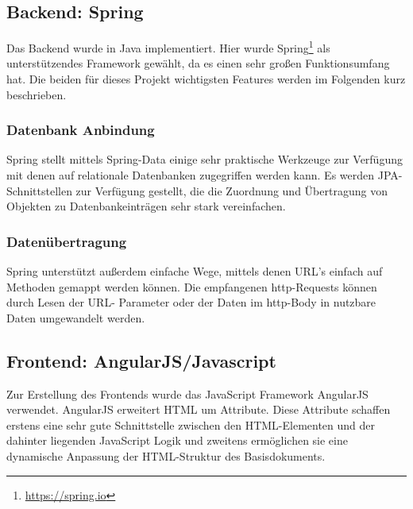 \subsection{Backend: Spring}
Das Backend wurde in Java implementiert. Hier wurde Spring\footnote{\url{https://spring.io}} als unterstützendes Framework gewählt, da es einen sehr großen Funktionsumfang hat. Die beiden für dieses Projekt wichtigsten Features werden im Folgenden kurz beschrieben.

\subsubsection{Datenbank Anbindung}
Spring stellt mittels Spring-Data einige sehr praktische Werkzeuge zur Verfügung mit denen auf relationale Datenbanken zugegriffen werden kann. Es werden JPA-Schnittstellen zur Verfügung gestellt, die die Zuordnung und Übertragung von Objekten zu Datenbankeinträgen sehr stark vereinfachen.

\subsubsection{Datenübertragung}
Spring unterstützt außerdem einfache Wege, mittels denen URL's einfach auf Methoden gemappt werden können. Die empfangenen http-Requests können durch Lesen der URL- Parameter oder der Daten im http-Body in nutzbare Daten umgewandelt werden.

\subsection{Frontend: AngularJS/Javascript}
Zur Erstellung des Frontends wurde das JavaScript Framework AngularJS verwendet. AngularJS erweitert HTML um Attribute. Diese Attribute schaffen erstens eine sehr gute Schnittstelle zwischen den HTML-Elementen und der dahinter liegenden JavaScript Logik und zweitens ermöglichen sie eine dynamische Anpassung der HTML-Struktur des Basisdokuments.
